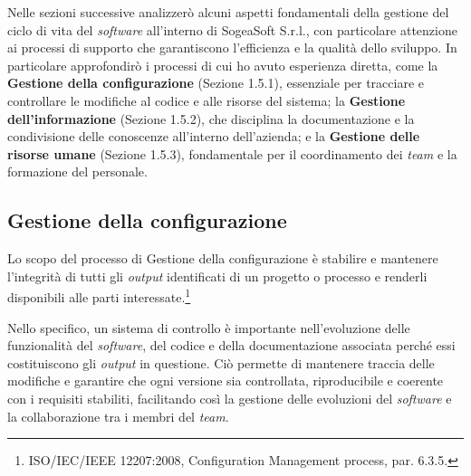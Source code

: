     \noindent Nelle sezioni successive analizzerò alcuni aspetti fondamentali della gestione del ciclo di vita del \textit{software} all'interno di SogeaSoft S.r.l., con particolare attenzione ai processi di supporto che garantiscono l'efficienza e la qualità dello sviluppo. In particolare approfondirò i processi di cui ho avuto esperienza diretta, come la \textbf{Gestione della configurazione} (Sezione 1.5.1), essenziale per tracciare e controllare le modifiche al codice e alle risorse del sistema; la \textbf{Gestione dell’informazione} (Sezione 1.5.2), che disciplina la documentazione e la condivisione delle conoscenze all'interno dell'azienda; e la \textbf{Gestione delle risorse umane} (Sezione 1.5.3), fondamentale per il coordinamento dei \textit{team} e la formazione del personale. 
    
    
        \subsection{Gestione della configurazione}
        Lo scopo del processo di Gestione della configurazione è stabilire e mantenere l'integrità di tutti gli \textit{output} identificati di un progetto o processo e renderli disponibili alle parti interessate.\footnote{ISO/IEC/IEEE 12207:2008, Configuration Management process, par. 6.3.5.}

        \vspace{0.2 em}
        \noindent Nello specifico, un sistema di controllo è importante nell'evoluzione delle funzionalità del \textit{software}, del codice e della documentazione associata perché essi costituiscono gli \textit{output} in questione. Ciò permette di mantenere traccia delle modifiche e garantire che ogni versione sia controllata, riproducibile e coerente con i requisiti stabiliti, facilitando così la gestione delle evoluzioni del \textit{software} e la collaborazione tra i membri del \textit{team}. 
        
